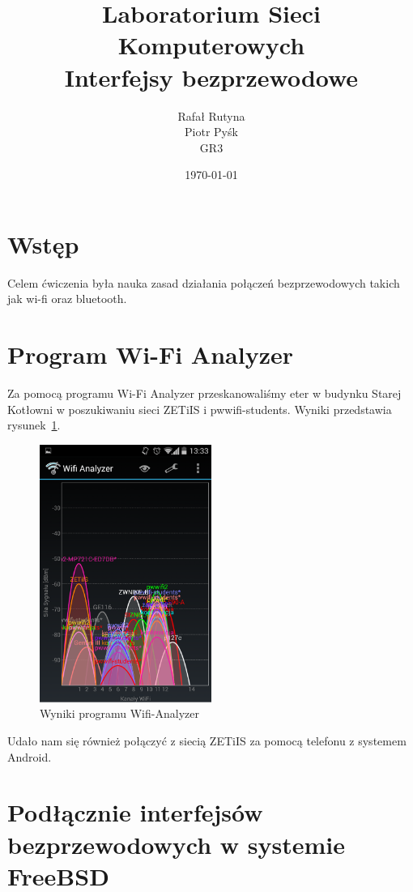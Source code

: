 \documentclass[a4paper,11pt,notitlepage]{article}
\author{Rafał Rutyna \\ Piotr Pyśk \\ GR3}
\title{Laboratorium Sieci Komputerowych \\ {\small Interfejsy bezprzewodowe}}
\date{\today}
\begin{document}
\maketitle
\newpage
\tableofcontents
\newpage

\section{Wstęp}

Celem ćwiczenia była nauka zasad działania połączeń bezprzewodowych takich jak wi-fi oraz bluetooth.

\section{Program Wi-Fi Analyzer}

Za pomocą programu Wi-Fi Analyzer przeskanowaliśmy eter w budynku Starej 
Kotłowni w poszukiwaniu sieci ZETiIS i pwwifi-students.
Wyniki przedstawia rysunek~\ref{wifi-analyzer}.

\begin{figure}[htb]
  \centering
  \includegraphics[width=0.5\textwidth]{analyzer.png}
  \caption{Wyniki programu Wifi-Analyzer}
  \label{wifi-analyzer}
\end{figure}

Udało nam się również połączyć z siecią ZETiIS za pomocą telefonu z systemem Android.

\section{Podłącznie interfejsów bezprzewodowych w systemie FreeBSD}
\end{document}
